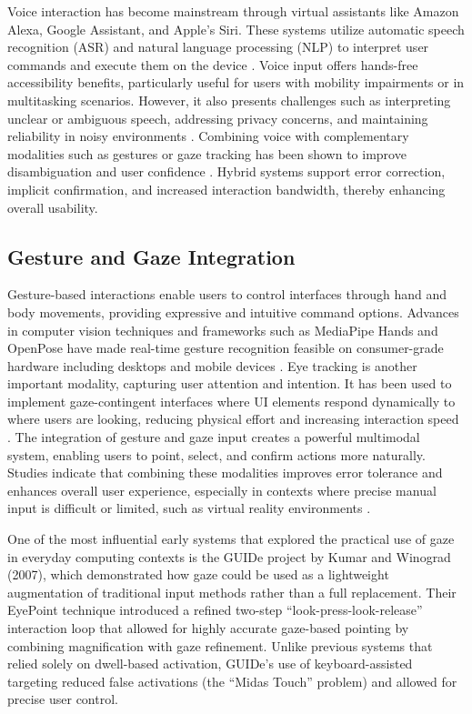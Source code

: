\documentclass[openany]{book}
\begin{document}
Voice interaction has become mainstream through virtual assistants like Amazon Alexa, Google Assistant, and Apple’s Siri. These systems utilize automatic speech recognition (ASR) and natural language processing (NLP) to interpret user commands and execute them on the device \cite{Hoy02012018}. Voice input offers hands-free accessibility benefits, particularly useful for users with mobility impairments or in multitasking scenarios. However, it also presents challenges such as interpreting unclear or ambiguous speech, addressing privacy concerns, and maintaining reliability in noisy environments \cite{HCI-076}. Combining voice with complementary modalities such as gestures or gaze tracking has been shown to improve disambiguation and user confidence \cite{s21237825}. Hybrid systems support error correction, implicit confirmation, and increased interaction bandwidth, thereby enhancing overall usability.

\subsection{Gesture and Gaze Integration}

Gesture-based interactions enable users to control interfaces through hand and body movements, providing expressive and intuitive command options. Advances in computer vision techniques and frameworks such as MediaPipe Hands and OpenPose have made real-time gesture recognition feasible on consumer-grade hardware including desktops and mobile devices \cite{lugaresi2019mediapipeframeworkbuildingperception}.  
Eye tracking is another important modality, capturing user attention and intention. It has been used to implement gaze-contingent interfaces where UI elements respond dynamically to where users are looking, reducing physical effort and increasing interaction speed \cite{Duchowski2017}.  
The integration of gesture and gaze input creates a powerful multimodal system, enabling users to point, select, and confirm actions more naturally. Studies indicate that combining these modalities improves error tolerance and enhances overall user experience, especially in contexts where precise manual input is difficult or limited, such as virtual reality environments \cite{7893331, Gazeinteractioninthepost-WIMPworld}.

One of the most influential early systems that explored the practical use of gaze in everyday computing contexts is the GUIDe project by Kumar and Winograd (2007), which demonstrated how gaze could be used as a lightweight augmentation of traditional input methods rather than a full replacement. Their EyePoint technique introduced a refined two-step “look-press-look-release” interaction loop that allowed for highly accurate gaze-based pointing by combining magnification with gaze refinement. Unlike previous systems that relied solely on dwell-based activation, GUIDe’s use of keyboard-assisted targeting reduced false activations (the “Midas Touch” problem) and allowed for precise user control.
\end{document}
